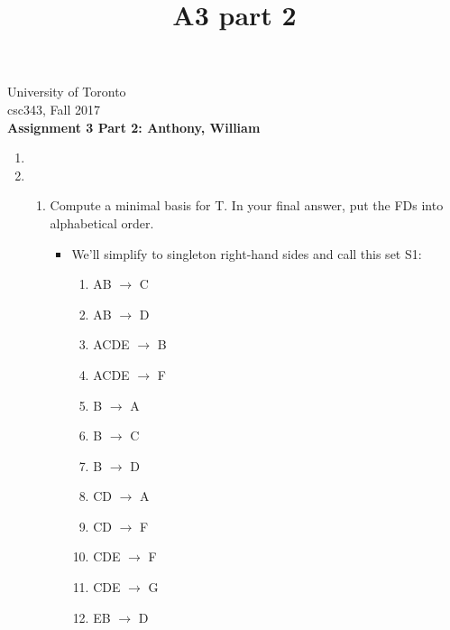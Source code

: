 \documentclass{article}
\title{A3 part 2}
\begin{document}
\noindent
University of Toronto\\
{\sc csc}343, Fall 2017\\[10pt]
{\LARGE\bf Assignment 3 Part 2: Anthony, William} \\[10pt]

\renewcommand{\labelenumiii}{\arabic{enumiii}}
\begin{enumerate}

\item %

\item %
\begin{enumerate}
\item %
Compute a minimal basis for T. In your final answer, put the FDs into alphabetical order.

\begin{itemize}
\item %
We'll simplify to singleton right-hand sides and call this set S1:
\begin{enumerate} 
\item AB $\rightarrow$ C
\item AB $\rightarrow$ D
\item ACDE $\rightarrow$ B
\item ACDE $\rightarrow$ F
\item B $\rightarrow$ A
\item B $\rightarrow$ C
\item B $\rightarrow$ D
\item CD $\rightarrow$ A
\item CD $\rightarrow$ F
\item CDE $\rightarrow$ F
\item CDE $\rightarrow$ G
\item EB $\rightarrow$ D
\end{enumerate}


\end{itemize}
\end{enumerate}
\end{enumerate}
\end{document}
